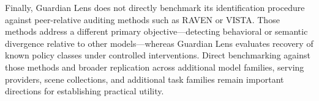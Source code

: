 Finally, Guardian Lens does not directly benchmark its identification
procedure against peer-relative auditing methods such as RAVEN or
VISTA. Those methods address a different primary objective---detecting
behavioral or semantic divergence relative to other models---whereas
Guardian Lens evaluates recovery of known policy classes under
controlled interventions. Direct benchmarking against those methods and
broader replication across additional model families, serving providers,
scene collections, and additional task families remain important directions for
establishing practical utility.
